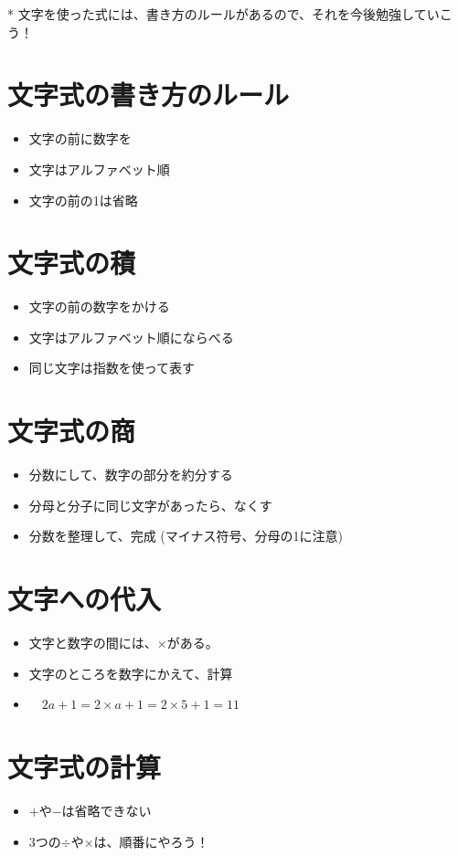 ﻿\documentclass{jsarticle}
\begin{document}
* 文字を使った式には、書き方のルールがあるので、それを今後勉強していこう！\\


\newpage

\section{文字式の書き方のルール}
\begin{itemize}
\item 文字の前に数字を
\item 文字はアルファベット順
\item 文字の前の1は省略
\end{itemize}

\section{文字式の積}
\begin{itemize}
\item 文字の前の数字をかける
\item 文字はアルファベット順にならべる
\item 同じ文字は指数を使って表す
\end{itemize}

\section{文字式の商}
\begin{itemize}
\item 分数にして、数字の部分を約分する
\item 分母と分子に同じ文字があったら、なくす
\item 分数を整理して、完成 (マイナス符号、分母の1に注意)
\end{itemize}

\section{文字への代入}
\begin{itemize}
\item 文字と数字の間には、$\times$がある。
\item 文字のところを数字にかえて、計算
\item {} \ \ $2a+1 = 2 \times a +1 = 2 \times 5 +1 =11$
\end{itemize}

\section{文字式の計算}
\begin{itemize}
\item $+$や$-$は省略できない
\item 3つの$\div$や$\times$は、順番にやろう！
\end{itemize}
\end{document}
